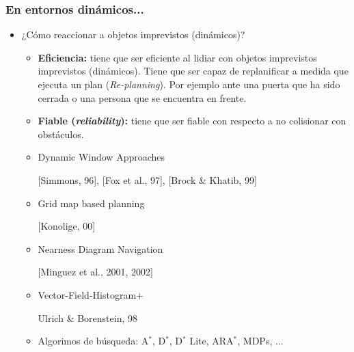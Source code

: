 \begin{frame}
    \frametitle{En entornos dinámicos...}
    
    \begin{itemize}
        \item ¿Cómo reaccionar a objetos imprevistos (dinámicos)?
        \begin{itemize}
            \item \textbf{Eficiencia:} tiene que ser eficiente al lidiar con objetos imprevistos imprevistos (dinámicos). Tiene que ser capaz de replanificar a medida que ejecuta un plan (\emph{Re-planning}). Por ejemplo ante una puerta que ha sido cerrada o una persona que se encuentra en frente.
            \item \textbf{Fiable (\emph{reliability}):} tiene que ser fiable con respecto a no colisionar con obstáculos.
        \end{itemize}
        
        \begin{itemize}
            \item Dynamic Window Approaches
            
            {\scriptsize [Simmons, 96], [Fox et al., 97], [Brock \& Khatib, 99]}
            \item Grid map based planning
            
            {\scriptsize [Konolige, 00]}
            
            \item Nearness Diagram Navigation
            
            {\scriptsize [Minguez et al., 2001, 2002]}
            
            \item Vector-Field-Histogram+
            
            {\scriptsize Ulrich \& Borenstein, 98}
            
            \item Algorimos de búsqueda: A$^{*}$, D$^{*}$, D$^{*}$ Lite, ARA$^{*}$, MDPs, ...
            
        \end{itemize}
        
    \end{itemize}
    
\end{frame}

